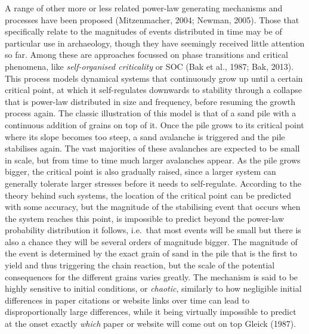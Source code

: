 \documentclass[
  12pt,
]{book}
\begin{document}
A range of other more or less related power-law generating mechanisms and processes have been proposed (Mitzenmacher, 2004; Newman, 2005). Those that specifically relate to the magnitudes of events distributed in time may be of particular use in archaeology, though they have seemingly received little attention so far. Among these are approaches focussed on phase transitions and critical phenomena, like \emph{self-organised criticality} or SOC (Bak et al., 1987; Bak, 2013). This process models dynamical systems that continuously grow up until a certain critical point, at which it self-regulates downwards to stability through a collapse that is power-law distributed in size and frequency, before resuming the growth process again. The classic illustration of this model is that of a sand pile with a continuous addition of grains on top of it. Once the pile grows to its critical point where its slope becomes too steep, a sand avalanche is triggered and the pile stabilises again. The vast majorities of these avalanches are expected to be small in scale, but from time to time much larger avalanches appear. As the pile grows bigger, the critical point is also gradually raised, since a larger system can generally tolerate larger stresses before it needs to self-regulate. According to the theory behind such systems, the location of the critical point can be predicted with some accuracy, but the magnitude of the stabilising event that occurs when the system reaches this point, is impossible to predict beyond the power-law probability distribution it follows, i.e.~that most events will be small but there is also a chance they will be several orders of magnitude bigger. The magnitude of the event is determined by the exact grain of sand in the pile that is the first to yield and thus triggering the chain reaction, but the scale of the potential consequences for the different grains varies greatly. The mechanism is said to be highly sensitive to initial conditions, or \emph{chaotic}, similarly to how negligible initial differences in paper citations or website links over time can lead to disproportionally large differences, while it being virtually impossible to predict at the onset exactly \emph{which} paper or website will come out on top Gleick (1987).
\end{document}
